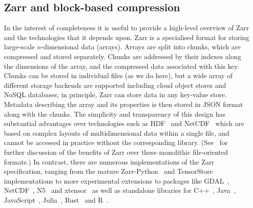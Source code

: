 \documentclass[a4paper,num-refs]{oup-contemporary}
\begin{document}
\subsection{Zarr and block-based compression}
In the interest of completeness it is useful to provide a high-level overview
of Zarr and the technologies that it depends upon. Zarr is a specialised format
for storing large-scale $n$-dimensional data (arrays). Arrays
are split into chunks, which are compressed and stored separately. Chunks are
addressed by their indexes along the dimensions of the array, and the
compressed data associated with this key. Chunks can
be stored in individual files (as we do here), but a wide array of different
storage backends are supported including cloud object stores
and NoSQL databases;
in principle, Zarr can store data in any key-value store.
Metadata describing the array and its properties is then stored
in JSON format along with the chunks.
The simplicity and transparency
of this design has substantial advantages over technologies
such as HDF~\citep{folk2011overview} and
NetCDF~\citep{rew1990netcdf} which are based on complex
layouts of multidimensional data within a single file,
and cannot be accessed in practice without the corresponding library.
(See~\cite{abernathey2021cloud} for further discussion of the benefits
of Zarr over these monolithic file-oriented formats.)
In contrast, there are numerous implementations
of the Zarr specification, ranging
from the mature Zarr-Python~\citep{zarrpython}
and TensorStore~\citep{tensorstore} implementations
to more experimental extensions to packages like
GDAL~\citep{gdal_zarr},
NetCDF~\citep{netcfd_c},
N5~\citep{n5zarr}
and xtensor~\citep{xtensor_zarr}
as well as  standalone libraries for
C++~\citep{ruan2024image},
Java~\cite{jzarr},
JavaScript~\cite{zarrjs},
Julia~\cite{zarrjl}, Rust~\citep{zarrs}
and R~\cite{pizzarr}.
\end{document}
